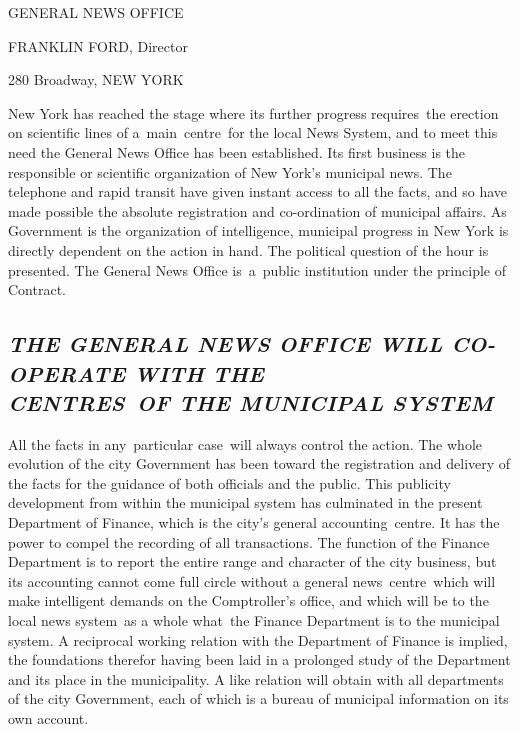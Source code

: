 \documentclass[twoside,symmetric,nobib,justified]{tufte-book}
\begin{document}
\vspace{0.8in}

\begin{center}
    {\LARGE GENERAL NEWS OFFICE}

    \vspace{.3in}

    {\Large FRANKLIN FORD, Director}

    \vspace{.3in}

    {\large 280 Broadway, NEW YORK}
    
\end{center}

\vspace{.5in}

 New York has reached the stage where its further
progress requires~the erection on scientific lines of a~main~centre~for
the local News System, and to meet this need the General News Office has
been established. Its first business is the responsible or scientific
organization of New York's municipal news. The telephone and rapid
transit have given instant access to all the facts, and so have made
possible the absolute registration and co-ordination of municipal
affairs. As Government is the organization of intelligence, municipal
progress in New York is directly dependent on the action in hand. The
political question of the hour is presented. The General News Office
is~a~public institution under the principle of Contract.~

\hypertarget{the-general-news-office-will-co-operate-with-the-centres-of-the-municipal-system}{%
\subsection{\emph{THE GENERAL NEWS OFFICE WILL CO-OPERATE WITH THE\\\noindent CENTRES~OF
THE MUNICIPAL
SYSTEM}}\label{the-general-news-office-will-co-operate-with-the-centres-of-the-municipal-system}}

All the facts in any~particular case~will always control the action. The
whole evolution of the city Government has been toward the registration
and delivery of the facts for the guidance of both officials and the
public. This publicity development from within the municipal system has
culminated in the present Department of Finance, which is the city's
general accounting~centre. It has the power to compel the recording of
all transactions. The function of the Finance Department is to report
the entire range and character of the city business, but its accounting
cannot come full circle without a general news~centre~which will make
intelligent demands on the Comptroller's office, and which will be to
the local news system~as a whole what~the Finance Department is to the
municipal system. A reciprocal working relation with the Department of
Finance is implied, the foundations therefor having been laid in a
prolonged study of the Department and its place in the municipality. A
like relation will obtain with all departments of the city Government,
each of which is a bureau of municipal information on its own account.~
\end{document}
